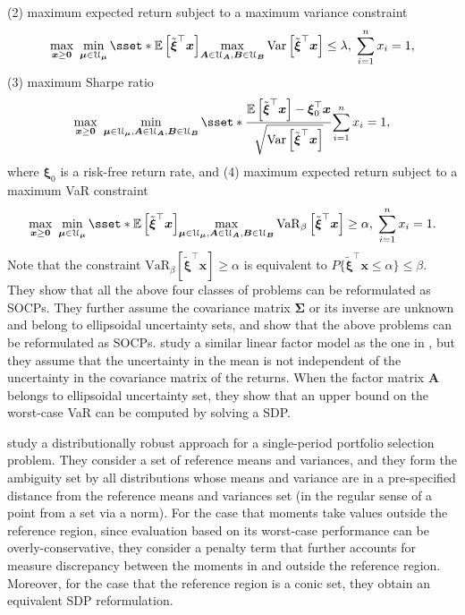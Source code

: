 \documentclass[final,onefignum,onetabnum]{class}
\newcommand{\e}[1]{\mathbb{E} \left[ #1 \right]}
\newcommand{\vvar}[2]{\mathrm{VaR}_{#1} \left[ #2 \right]}
\newcommand{\Var}[1]{\mathrm{Var} \left[ #1 \right]}
\newcommand{\bs}[1]{\boldsymbol{#1}} %
\newcommand{\Cs}[1]{\mathcal{#1}} %
\newcommand{\txi}{\tilde{\bs{\xi}}}
\begin{document}
(2) maximum expected return subject to a maximum variance constraint 
$$\max_{\bs{x} \ge \bs{0}} \ \min_{\bs{\mu} \in \Cs{U}_{\bs{\mu}}} \sset*{\e{\txi^{\top} \bs{x}}}{\max_{\bs{A} \in \Cs{U}_{\bs{A}}, \bs{B} \in \Cs{U}_{\bs{B}}} \Var{\txi^{\top} \bs{x}} \le \lambda, \; \sum_{i=1}^{n} x_{i}=1},  $$
(3) maximum Sharpe ratio 
$$\max_{\bs{x} \ge \bs{0}} \ \min_{\bs{\mu} \in \Cs{U}_{\bs{\mu}}, \bs{A} \in \Cs{U}_{\bs{A}}, \bs{B} \in \Cs{U}_{\bs{B}}} \sset*{\frac{\e{\txi^{\top} \bs{x}}-\bs{\xi}_{0}^{\top} \bs{x}}{\sqrt{\Var{\txi^{\top}\bs{x}}}}}{\sum_{i=1}^{n} x_{i}=1},$$
where $\bs{\xi}_{0}$ is a risk-free return rate, and (4) maximum expected return subject to a maximum VaR constraint
$$\max_{\bs{x} \ge \bs{0}} \ \min_{\bs{\mu} \in \Cs{U}_{\bs{\mu}}} \sset*{\e{\txi^{\top} \bs{x}}}{\max_{\bs{\mu} \in \Cs{U}_{\bs{\mu}}, \bs{A} \in \Cs{U}_{\bs{A}}, \bs{B} \in \Cs{U}_{\bs{B}}} \vvar{\beta}{\txi^{\top} \bs{x}} \ge \alpha, \; \sum_{i=1}^{n} x_{i}=1}.  $$
Note that the constraint $\vvar{\beta}{\txi^{\top} \bs{x}} \ge \alpha$ is equivalent to $P\{\txi^{\top} \bs{x} \le \alpha\} \le \beta$. 
They show that all the above four classes of problems can be reformulated as SOCPs. They further assume the covariance matrix $\bs{\Sigma}$ or its inverse are unknown and belong to ellipsoidal uncertainty sets, and  show that  the above problems can be reformulated as SOCPs. 
\citet{ghaoui2003worst} study a similar linear factor model as the one in \citet{goldfarb2003}, but they assume that the  uncertainty in the mean is not independent  
of the uncertainty in the covariance matrix of the
returns. When the factor matrix $\bs{A}$ belongs to ellipsoidal uncertainty set, they show that an upper bound on the worst-case VaR can be computed by solving a SDP.

 \citet{li2013} study a distributionally robust approach for a single-period portfolio selection problem. They consider a set of reference means and variances, and they form the ambiguity set by all distributions whose means and variance are in a pre-specified distance from the reference means and variances set (in the regular sense of a point from a set via a norm). For the case that moments take values outside
the reference region, since evaluation based on its worst-case performance can be overly-conservative,
they consider a penalty term that further accounts for measure discrepancy between the moments in and outside the reference region. Moreover, for the case that the reference region is a conic set, they obtain an equivalent SDP reformulation. 
\end{document}
